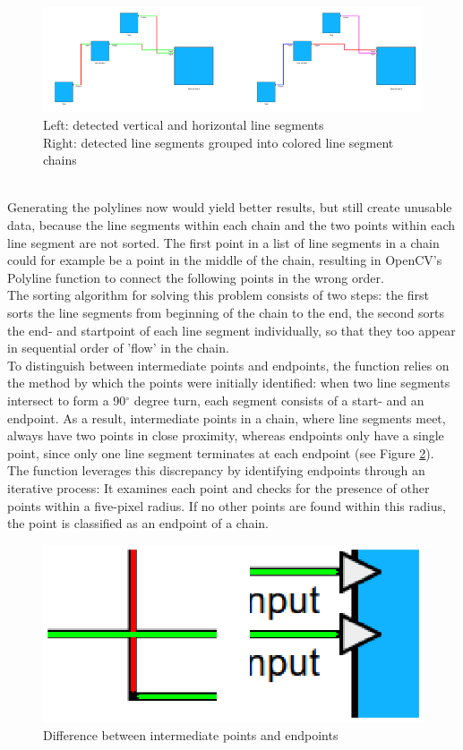 \begin{figure}[h]
    \centering
    \includegraphics[width=\linewidth]{Pictures/chains_before_after.png}
    \caption{Left: detected vertical and horizontal line segments\\Right: detected line segments grouped into colored line segment chains}
    \label{fig_chains_before_after}
\end{figure}\\
Generating the polylines now would yield better results, but still create unusable data, because the line segments within each chain and the two points within each line segment are not sorted. The first point in a list of line segments in a chain could for example be a point in the middle of the chain, resulting in OpenCV's Polyline function to connect the following points in the wrong order.\\
The sorting algorithm for solving this problem consists of two steps: the first sorts the line segments from beginning of the chain to the end, the second sorts the end- and startpoint of each line segment individually, so that they too appear in sequential order of 'flow' in the chain.\\
To distinguish between intermediate points and endpoints, the function relies on the method by which the points were initially identified: when two line segments intersect to form a 90$^{\circ}$ degree turn, each segment consists of a start- and an endpoint. As a result, intermediate points in a chain, where line segments meet, always have two points in close proximity, whereas endpoints only have a single point, since only one line segment terminates at each endpoint (see Figure \ref{fig_point_zoom}).
The function leverages this discrepancy by identifying endpoints through an iterative process: It examines each point and checks for the presence of other points within a five-pixel radius. If no other points are found within this radius, the point is classified as an endpoint of a chain.\\
\begin{figure}
    \centering
    \includegraphics[width=0.5\linewidth]{Pictures/zoomed_in_points.png}
    \caption{Difference between intermediate points and endpoints}
    \label{fig_point_zoom}
\end{figure}

